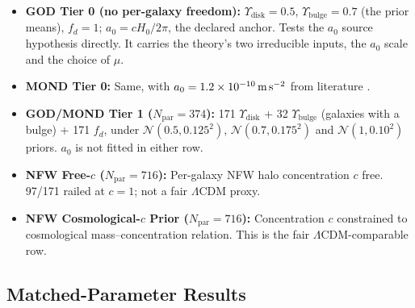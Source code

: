 \documentclass[aps,prd,preprint,superscriptaddress,nofootinbib,amsmath,amssymb,floatfix]{revtex4-2}
\makeatletter
\DeclareRobustCommand{\_}{%
    \ifmmode\nfss@text{\textunderscore}\else\textunderscore\penalty\z@\fi}%
\makeatother
\begin{document}
\begin{itemize}
    \item \textbf{GOD Tier 0 (no per-galaxy freedom):} $\Upsilon_{\text{disk}} = 0.5$, $\Upsilon_{\text{bulge}} = 0.7$ (the prior means), $f_d = 1$; $a_0 = cH_0/2\pi$, the declared anchor. Tests the $a_0$ source hypothesis directly. It carries the theory's two irreducible inputs, the $a_0$ scale and the choice of $\mu$.
    \item \textbf{MOND Tier 0:} Same, with $a_0 = 1.2 \times 10^{-10}\,\text{m\,s}^{-2}$ from literature \cite{McGaugh2016}.
    \item \textbf{GOD/MOND Tier 1 ($N_{\text{par}} = 374$):} 171 $\Upsilon_{\text{disk}}$ + 32 $\Upsilon_{\text{bulge}}$ (galaxies with a bulge) + 171 $f_d$, under $\mathcal{N}(0.5, 0.125^2)$, $\mathcal{N}(0.7, 0.175^2)$ and $\mathcal{N}(1, 0.10^2)$ priors. $a_0$ is not fitted in either row.
    \item \textbf{NFW Free-$c$ ($N_{\text{par}} = 716$):} Per-galaxy NFW halo concentration $c$ free. 97/171 railed at $c=1$; not a fair $\Lambda$CDM proxy.
    \item \textbf{NFW Cosmological-$c$ Prior ($N_{\text{par}} = 716$):} Concentration $c$ constrained to cosmological mass--concentration relation. This is the fair $\Lambda$CDM-comparable row.
\end{itemize}

\subsection{Matched-Parameter Results}
\end{document}
